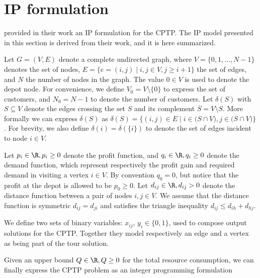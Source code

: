 \chapter{IP formulation}

\cite{Jepsen2014} provided in their work an IP formulation for the CPTP.
The IP model presented in this section is derived from their work, and it is here summarized.

Let $G = \left(V, E \right)$ denote a complete undirected graph, where $V = \lbrace 0, 1, \dots, N - 1 \rbrace$ denotes the set of nodes,
$E = \lbrace  e = (i, j) \mid i,j \in V, j \ge i + 1 \rbrace$ the set of edges, and $N$ the number of nodes in the graph.
The value $0 \in V$ is used to denote the depot node.
For convenience, we define $V_0 = V \setminus \{0\}$ to express the set of customers, and $N_0 = N - 1$ to denote the number of customers.
Let $\delta(S)$ with $S \subseteq V$ denote the edges crossing the set $S$ and its complement $\overline{S} = V \setminus S$.
More formally we can express $\delta(S)$ as $\delta(S) = \lbrace (i, j) \in E \mid i \in \lparen S \cap V \rparen, j \in \lparen \overline{S} \cap V \rparen \rbrace$.
For brevity, we also define $\delta(i) = \delta(\{i\})$ to denote the set of edges incident to node $i \in V$.

Let $p_{i} \in \R, p_{i} \ge 0$ denote the profit function, and $q_{i} \in \R, q_{i} \ge 0$ denote the demand function, which represent respectively the profit gain and required demand in visiting a vertex $i \in V$.
By convention $q_0 = 0$, but notice that the profit at the depot is allowed to be $p_0 \ge 0$.
Let $d_{ij} \in \R, d_{ij} > 0$ denote the distance function between a pair of nodes  $i, j \in V$.
We assume that the distance function is symmetric $d_{ij} = d_{ji}$ and satisfies the triangle inequality $d_{ij} \le d_{ih} + d_{hj}$.

We define two sets of binary variables: $x_{ij}$, $y_{i} \in \lbrace 0, 1 \rbrace$, used to compose output solutions for the CPTP.
Together they model respectively an edge and a vertex as being part of the tour solution.

Given an upper bound $Q \in \R,Q \ge 0$ for the total resource consumption, we can finally express the CPTP problem as an integer programming formulation


